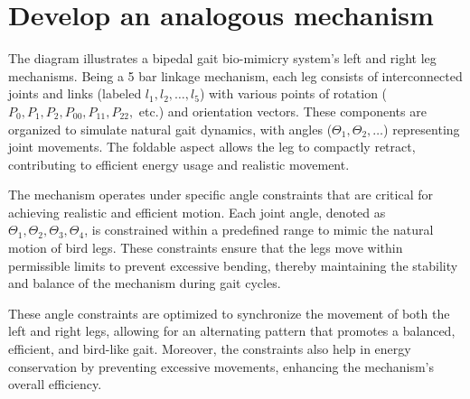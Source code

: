 \documentclass[12pt]{article}
\begin{document}

\section*{Develop an analogous mechanism }
The diagram illustrates a bipedal gait bio-mimicry system's left and right leg mechanisms. Being a 5 bar linkage mechanism, each leg consists of interconnected joints and links (labeled \( l_1, l_2, \ldots, l_5 \)) with various points of rotation (\( P_{0}, P_{1}, P_{2},P_{00}, P_{11}, P_{22}, \) etc.)  and orientation vectors. These components are organized to simulate natural gait dynamics, with angles (\( \Theta_1, \Theta_2, \ldots \)) representing joint movements. The foldable aspect allows the leg to compactly retract, contributing to efficient energy usage and realistic movement.

The mechanism operates under specific angle constraints that are critical for achieving realistic and efficient motion. Each joint angle, denoted as \( \Theta_1, \Theta_2, \Theta_3, \Theta_4 \), is constrained within a predefined range to mimic the natural motion of bird legs. These constraints ensure that the legs move within permissible limits to prevent excessive bending, thereby maintaining the stability and balance of the mechanism during gait cycles.

These angle constraints are optimized to synchronize the movement of both the left and right legs, allowing for an alternating pattern that promotes a balanced, efficient, and bird-like gait. Moreover, the constraints also help in energy conservation by preventing excessive movements, enhancing the mechanism's overall efficiency.
\end{document}
